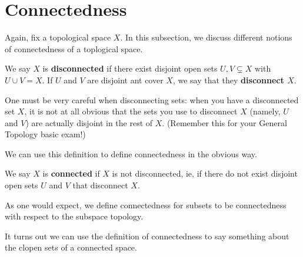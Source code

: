 \section{Connectedness}

Again, fix a topological space $X$. In this subsection, we discuss different notions of connectedness of a toplogical space.

\begin{boxdefinition}[Disconnectedness]
    We say $X$ is \textbf{disconnected} if there exist disjoint open sets $U, V \subsetneq X$ with $U \cup V = X$. If $U$ and $V$ are disjoint ant cover $X$, we say that they \textbf{disconnect $X$}.
\end{boxdefinition}
\begin{remark}
    One must be very careful when disconnecting sets: when you have a disconnected set $X$, it is not at all obvious that the sets you use to disconnect $X$ (namely, $U$ and $V$) are actually disjoint in the rest of $X$. (Remember this for your General Topology basic exam!)
\end{remark}

We can use this definition to define connectedness in the obvious way.

\begin{boxdefinition}[Connectedness]
    We say $X$ is \textbf{connected} if $X$ is not disconnected, ie, if there do not exist disjoint open sets $U$ and $V$ that disconnect $X$.
\end{boxdefinition}

As one would expect, we define connectedness for subsets to be connectedness with respect to the subspace topology.

It turns out we can use the definition of connectedness to say something about the clopen sets of a connected space.

